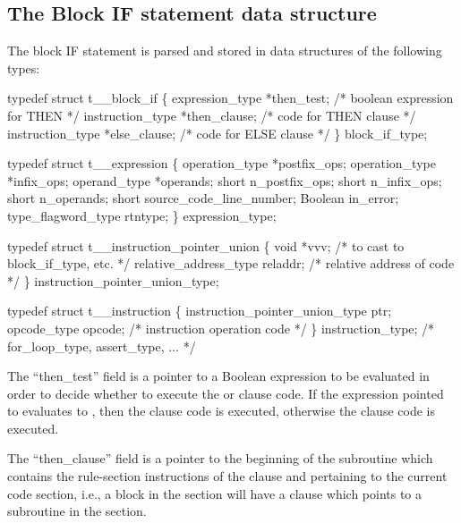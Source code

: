 \subsection{The Block IF statement data structure}
\label{sec:blockif}

The block IF statement is parsed and stored in data
structures of the following types:
\begin{codeexample}
typedef struct t__block_if
   \{
       expression_type *then_test;    /* boolean expression for THEN */
       instruction_type *then_clause; /* code for THEN clause */
       instruction_type *else_clause; /* code for ELSE clause */
   \} block_if_type;
\end{codeexample}

\begin{codeexample}
typedef struct t__expression
   \{
       operation_type *postfix_ops;
       operation_type *infix_ops;
       operand_type *operands;
       short n_postfix_ops;
       short n_infix_ops;
       short n_operands;
       short source_code_line_number;
       Boolean in_error;
       type_flagword_type rtntype;
   \} expression_type;
\end{codeexample}

\begin{codeexample}
typedef struct t__instruction_pointer_union
   \{
       void *vvv;                      /* to cast to block_if_type, etc. */
       relative_address_type reladdr;  /* relative address of code */
   \} instruction_pointer_union_type;
\end{codeexample}

\begin{codeexample}
typedef struct t__instruction
   \{
       instruction_pointer_union_type ptr;
       opcode_type opcode;      /* instruction operation code */
   \} instruction_type;          /*    for_loop_type, assert_type, ... */
\end{codeexample}


The ``then\_test'' field is a pointer to a Boolean expression to be evaluated
in order to decide whether to execute the 
or  clause code.   If the
expression pointed to evaluates to , then the  clause code
is executed, otherwise the  clause code is executed.

The ``then\_clause'' field is a pointer to the beginning of the subroutine
which contains the rule-section instructions of the  clause
and pertaining to the current code
section, i.e., a block  in the  section will
have a  clause which points to a subroutine in the 
section.

